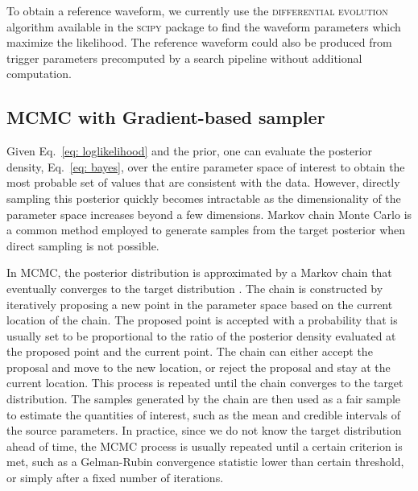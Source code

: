 \documentclass[twocolumn]{aastex631}
\newcommand{\te}[1]{\textbf{\color{pyRed}(TE: #1)}}
\begin{document}

To obtain a reference waveform, we currently use the \textsc{differential
evolution} algorithm \cite{Storn1997DifferentialE} available in the
\textsc{scipy} package \cite{2020SciPy-NMeth} to find the waveform parameters
which maximize the likelihood.  The reference waveform could also be produced
from trigger parameters precomputed by a search pipeline without additional
computation.

\subsection{MCMC with Gradient-based sampler}
\label{sec:gradient}

Given Eq.~\eqref{eq: loglikelihood} and the prior, one can evaluate the
posterior density, Eq.~\eqref{eq: bayes}, over the entire parameter space of
interest to obtain the most probable set of values that are consistent with the
data. However, directly sampling this posterior quickly becomes intractable as
the dimensionality of the parameter space increases beyond a few dimensions.
Markov chain Monte Carlo \cite{gelmanbda04} is a common method employed to
generate samples from the target posterior when direct sampling is not
possible.

In MCMC, the posterior distribution is approximated by a Markov chain that
eventually converges to the target distribution \cite{10.1214/aos/1176325750}.
The chain is constructed by iteratively proposing a new point in the
parameter space based on the current location of the chain. The proposed point
is accepted with a probability that is usually set to be proportional to the
ratio of the posterior density evaluated at the proposed point and the current
point. The chain can either accept the proposal and move to the new location,
or reject the proposal and stay at the current location. This process is
repeated until the chain converges to the target distribution. The samples
generated by the chain are then used as a fair sample to estimate the
quantities of interest, such as the mean and credible intervals of the source
parameters. In practice, since we do not know the target distribution ahead of
time, the MCMC process is usually repeated until a certain criterion is met,
such as a Gelman-Rubin convergence statistic \cite{10.2307/2246093} lower than
certain threshold, or simply after a fixed number of iterations.
\end{document}
